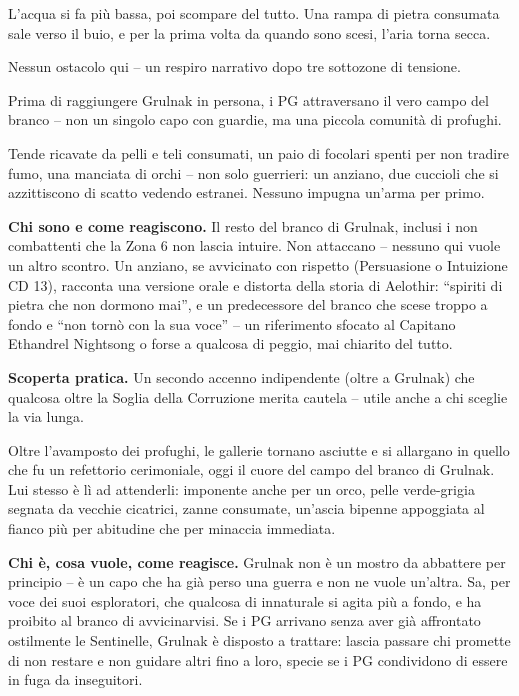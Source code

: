 \label{area:puntorisalita}

\begin{DndReadAloud}[]
  L'acqua si fa più bassa, poi scompare del tutto. Una rampa di pietra consumata sale verso il buio, e per la prima volta da quando sono scesi, l'aria torna secca.
\end{DndReadAloud}

Nessun ostacolo qui -- un respiro narrativo dopo tre sottozone di tensione.


Prima di raggiungere Grulnak in persona, i PG attraversano il vero campo del branco -- non un singolo capo con guardie, ma una piccola comunità di profughi.

\begin{DndReadAloud}[]
  Tende ricavate da pelli e teli consumati, un paio di focolari spenti per non tradire fumo, una manciata di orchi -- non solo guerrieri: un anziano, due cuccioli che si azzittiscono di scatto vedendo estranei. Nessuno impugna un'arma per primo.
\end{DndReadAloud}

\textbf{Chi sono e come reagiscono.} Il resto del branco di Grulnak, inclusi i non combattenti che la Zona 6 non lascia intuire. Non attaccano -- nessuno qui vuole un altro scontro. Un anziano, se avvicinato con rispetto (Persuasione o Intuizione CD 13), racconta una versione orale e distorta della storia di Aelothir: ``spiriti di pietra che non dormono mai'', e un predecessore del branco che scese troppo a fondo e ``non tornò con la sua voce'' -- un riferimento sfocato al Capitano Ethandrel Nightsong o forse a qualcosa di peggio, mai chiarito del tutto.

\textbf{Scoperta pratica.} Un secondo accenno indipendente (oltre a Grulnak) che qualcosa oltre la Soglia della Corruzione merita cautela -- utile anche a chi sceglie la via lunga.


Oltre l'avamposto dei profughi, le gallerie tornano asciutte e si allargano in quello che fu un refettorio cerimoniale, oggi il cuore del campo del branco di Grulnak. Lui stesso è lì ad attenderli: imponente anche per un orco, pelle verde-grigia segnata da vecchie cicatrici, zanne consumate, un'ascia bipenne appoggiata al fianco più per abitudine che per minaccia immediata.

\textbf{Chi è, cosa vuole, come reagisce.} Grulnak non è un mostro da abbattere per principio -- è un capo che ha già perso una guerra e non ne vuole un'altra. Sa, per voce dei suoi esploratori, che qualcosa di innaturale si agita più a fondo, e ha proibito al branco di avvicinarvisi. Se i PG arrivano senza aver già affrontato ostilmente le Sentinelle, Grulnak è disposto a trattare: lascia passare chi promette di non restare e non guidare altri fino a loro, specie se i PG condividono di essere in fuga da inseguitori.

